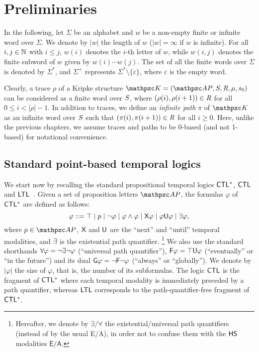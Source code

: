 \section{Preliminaries}\label{sec:backgr}

In the following, let $\Sigma$ be an alphabet and $w$ be a non-empty finite or infinite word over $\Sigma$. We denote by $|w|$ the length of $w$ ($|w|=\infty$ if $w$ is infinite). For all  $i,j\in\mathbb{N}$ with $i\leq j$, $w(i)$ denotes the
$i$-th letter of $w$, while $w(i,j)$ denotes the finite subword of $w$ given by $w(i)\cdots w(j)$.
The set of all the finite words over $\Sigma$ is denoted by $\Sigma^*$, and $\Sigma^+$ represents $\Sigma^*\setminus\{\varepsilon\}$, where $\varepsilon$ is the empty word.

Clearly, a trace $\rho$ of a Kripke structure $\Ku=\KuDef$ can be considered as a finite word over $S$, where $(\rho(i),\rho(i+1))\in\textit{R}$ for all $0\leq i<|\rho|-1$.
In addition to traces, we define an \emph{infinite path} $\pi$ of $\Ku$ as an infinite word over $S$ such that $(\pi(i),\pi(i+1))\in \textit{R}$ for all $i\geq 0$.
Here, unlike the previous chapters, we assume traces and paths to be 0-based (and not 1-based) for notational convenience.

\subsection{Standard point-based temporal logics}\label{sect:PTL}

We start now by recalling the standard propositional temporal logics $\text{\sffamily CTL$^{*}$}$, $\text{\sffamily CTL}$  and $\text{\sffamily LTL}$~\cite{EH86,Pnu77}.
%
Given a set of proposition letters $\Prop$, the formulas $\varphi$ of
$\text{\sffamily CTL$^{*}$}$ are defined as follows:
%
\[
\varphi ::= \top \mid p \mid \neg \varphi \mid \varphi \wedge \varphi \mid \textsf{X} \varphi \mid \varphi \textsf{U} \varphi \mid \exists  \varphi ,
\]
%
where $p\in \Prop$, $\textsf{X}$ and $\textsf{U}$ are the
``next'' and ``until'' temporal modalities,   and $\exists$ is the
 existential path quantifier.%
\footnote{Hereafter, we denote by $\exists/\forall$ the existential/universal path quantifiers (instead of by the usual E/A), in order not to confuse them with the $\text{\sffamily HS}$ modalities $\mathsf{E}/\mathsf{A}$.}
 We also use the standard shorthands $\forall\varphi=\neg\exists\neg\varphi$ (``universal path quantifier''),
$\textsf{F}\varphi= \top \textsf{U} \varphi$ (``eventually'' or ``in the future'') and its
dual $\textsf{G} \varphi=\neg \textsf{F}\neg\varphi$ (``always'' or ``globally'').
We denote by $|\varphi|$ the size of $\varphi$, that is, the number of its subformulas.
%
The logic $\text{\sffamily CTL}$ is the  fragment of $\text{\sffamily CTL$^{*}$}$ where each temporal modality is immediately preceded by a path quantifier, whereas  $\text{\sffamily LTL}$ corresponds to the path-quantifier-free  fragment of $\text{\sffamily CTL$^{*}$}$.

